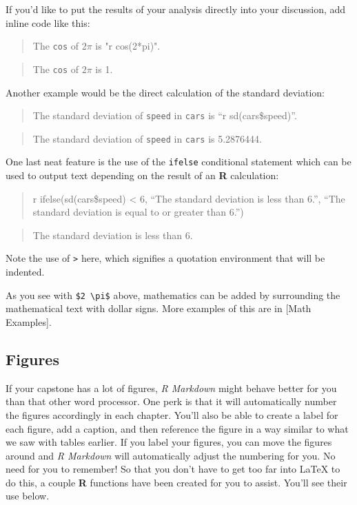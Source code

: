 \documentclass[12pt,oneside]{chicagocapstone}
\begin{document}
If you'd like to put the results of your analysis directly into your discussion, add inline code like this:
\begin{quote}
The \texttt{cos} of \(2 \pi\) is "r cos(2*pi)".
\end{quote}
\begin{quote}
The \texttt{cos} of \(2 \pi\) is 1.
\end{quote}
Another example would be the direct calculation of the standard deviation:
\begin{quote}
The standard deviation of \texttt{speed} in \texttt{cars} is ``r sd(cars\$speed)''.
\end{quote}
\begin{quote}
The standard deviation of \texttt{speed} in \texttt{cars} is 5.2876444.
\end{quote}
One last neat feature is the use of the \texttt{ifelse} conditional statement which can be used to output text depending on the result of an \textbf{R} calculation:
\begin{quote}
r ifelse(sd(cars\$speed) \textless{} 6, ``The standard deviation is less than 6.'', ``The standard deviation is equal to or greater than 6.'')
\end{quote}
\begin{quote}
The standard deviation is less than 6.
\end{quote}
Note the use of \texttt{\textgreater{}} here, which signifies a quotation environment that will be indented.

As you see with \texttt{\$2\ \textbackslash{}pi\$} above, mathematics can be added by surrounding the mathematical text with dollar signs. More examples of this are in {[}Math Examples{]}.

\hypertarget{figures}{%
\subsection*{Figures}\label{figures}}

If your capstone has a lot of figures, \emph{R Markdown} might behave better for you than that other word processor. One perk is that it will automatically number the figures accordingly in each chapter. You'll also be able to create a label for each figure, add a caption, and then reference the figure in a way similar to what we saw with tables earlier. If you label your figures, you can move the figures around and \emph{R Markdown} will automatically adjust the numbering for you. No need for you to remember! So that you don't have to get too far into LaTeX to do this, a couple \textbf{R} functions have been created for you to assist. You'll see their use below.
\end{document}

